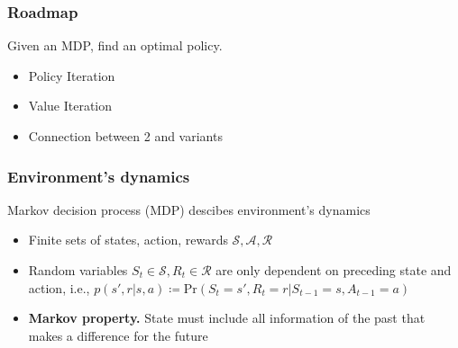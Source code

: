 \documentclass[10pt]{beamer}
\theoremstyle{remark}
\begin{document}
\begin{frame}
\frametitle{Roadmap}
Given an MDP, find an optimal policy.
\begin{itemize}
    \item Policy Iteration
    \item Value Iteration
    \item Connection between 2 and variants
\end{itemize}
\end{frame}



\begin{frame}
    \frametitle{Environment's dynamics}
    Markov decision process (MDP) descibes environment's dynamics
   \begin{itemize}
       \item Finite sets of states, action, rewards $\mathcal{S}, \mathcal{A}, \mathcal{R}$
       \item Random variables $S_t \in \mathcal{S}, R_t \in \mathcal{R}$ are only dependent on preceding state and action, i.e.,
           $ p(s', r | s, a) \coloneqq \text{Pr}(S_t = s', R_t = r | S_{t-1} = s, A_{t-1} = a)$ 
       \item \textbf{Markov property.} State must include all information of the past that makes a difference for the future
   \end{itemize}
\end{frame}
\end{document}
